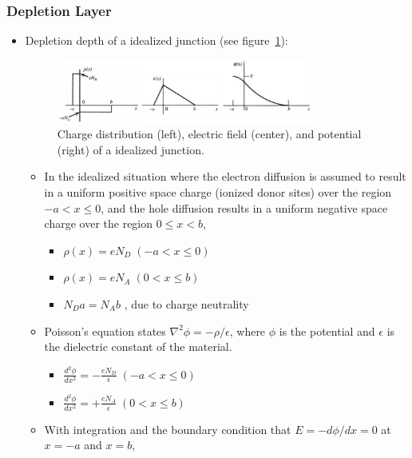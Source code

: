 \subsubsection{Depletion Layer}
\begin{itemize}
    \item Depletion depth of a idealized junction (see figure~\ref{fig:depletion_depth_calc}):
    \begin{figure}[ht]
        \centering
        \includegraphics[width=0.8\textwidth]{images/depletion_depth_calc.png}
        \caption{Charge distribution (left), electric field (center), and potential (right) of a idealized junction.}
        \label{fig:depletion_depth_calc}
    \end{figure}
    \begin{itemize}
        \item In the idealized situation where the electron diffusion is assumed to result in a uniform positive space charge (ionized donor sites) over the region $-a<x\leq0$, and the hole diffusion results in a uniform negative space charge over the region $0\leq x<b$, 
        \begin{itemize}
            \item[] $\rho(x)=eN_D\;(-a<x\leq0)$
            \item[] $\rho(x)=eN_A\;(0<x\leq b)$
            \item[] $N_Da=N_Ab$ , due to charge neutrality
        \end{itemize}
        \item Poisson's equation states $\nabla^2\phi=-\rho/\epsilon$, where $\phi$ is the potential and $\epsilon$ is the dielectric constant of the material.
        \begin{itemize}
            \item[] $\frac{d^2\phi}{dx^2}=-\frac{eN_D}{\epsilon}\;(-a<x\leq0)$
            \item[] $\frac{d^2\phi}{dx^2}=+\frac{eN_A}{\epsilon}\;(0<x\leq b)$
        \end{itemize}
        \item With integration and the boundary condition that $E=-d\phi/dx=0$ at $x=-a$ and $x=b$,
        \begin{itemize}

\end{itemize}
\end{itemize}
\end{itemize}
